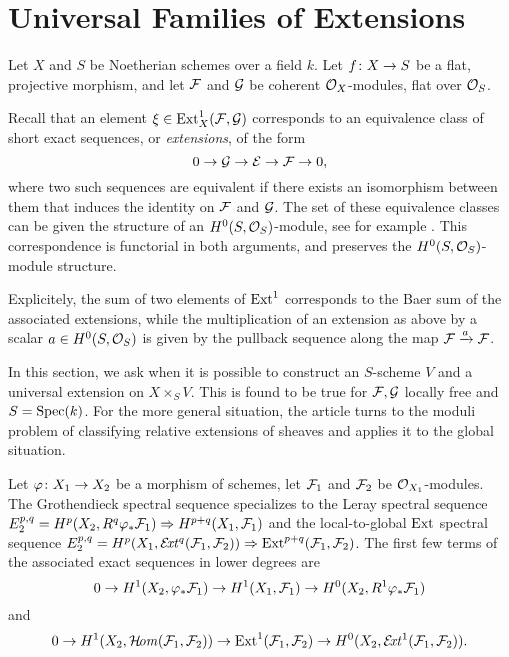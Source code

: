 \section{Universal Families of Extensions}

Let $X$ and $S$ be Noetherian schemes over a field $k$. Let $f \colon X \to S$ be a flat, projective morphism, and let $\mathcal{F}$ and $\mathcal{G}$ be coherent $\mathcal{O}_X$-modules, flat over $\mathcal{O}_S$.

Recall that an element $\xi \in \operatorname{Ext}^1_{X}(\mathcal{F},\mathcal{G})$ corresponds to an equivalence class of short exact sequences, or \emph{extensions}, of the form
\[
	0 \to \mathcal{G} \to \mathcal{E} \to \mathcal{F} \to 0,
\]
where two such sequences are equivalent if there exists an isomorphism between them that induces the identity on $\mathcal{F}$ and $\mathcal{G}$. The set of these equivalence classes can be given the structure of an $H^0(S,\mathcal{O}_S)$-module, see for example \cite[{}3.4]{weibel-homological-algebra}. This correspondence is functorial in both arguments, and preserves the $H^0(S, \mathcal{O}_S)$-module structure.

Explicitely, the sum of two elements of $\operatorname{Ext}^1$ corresponds to the Baer sum of the associated extensions, while the multiplication of an extension
as above by a scalar $a\in H^0(S,\mathcal{O}_S)$ is given by the pullback sequence along the map $\mathcal{F}\xrightarrow{a}\mathcal{F}$.

In this section, we ask when it is possible to construct an $S$-scheme $V$ and a universal extension on $X\times_S V$. This is found to be true for $\mathcal{F},\mathcal{G}$ locally free and $S=\operatorname{Spec}(k)$. For the more general situation, the article \cite{lange-universal-extensions} turns to the moduli problem of classifying relative extensions of sheaves and applies it to the global situation.

\begin{remark} \label{small-spectral-sequence}
Let $\varphi \colon X_1 \to X_2$ be a morphism of schemes, let $\mathcal{F}_1$ and $\mathcal{F}_2$ be $\mathcal{O}_{X_1}$-modules. The Grothendieck spectral sequence \cite[Theorem~23.3.5]{vakil-algebraic-geometry} specializes to the Leray spectral sequence
$E_2^{p,q}=H^p(X_2,R^q \varphi_*\mathcal{F}_1) \Rightarrow H^{p+q}(X_1,\mathcal{F}_1)$
and the local-to-global $\operatorname{Ext}$ spectral sequence
$E_2^{p,q}=H^p(X_1,\mathcal{E}\!\mathit{xt}^q(\mathcal{F}_1,\mathcal{F}_2)) \Rightarrow \operatorname{Ext}^{p+q}(\mathcal{F}_1,\mathcal{F}_2)$.
The first few terms of the associated exact sequences in lower degrees are 
\begin{equation}
	0
	\to H^1(X_2,\varphi_{*} \mathcal{F}_1)
	\to H^1(X_1,\mathcal{F}_1)
	\to H^0(X_2, R^1 \varphi_{*} \mathcal{F}_1) \label{leray-es}
\end{equation}
and
\begin{equation}
	0
	\to H^1(X_2,\mathcal{H}\!\mathit{om}(\mathcal{F}_1,\mathcal{F}_2))
	\to \operatorname{Ext}^1(\mathcal{F}_1,\mathcal{F}_2)
	\to H^0(X_2,\mathcal{E}\!\mathit{xt}^1(\mathcal{F}_1,\mathcal{F}_2)). \label{ext-es}
\end{equation}
\end{remark}

